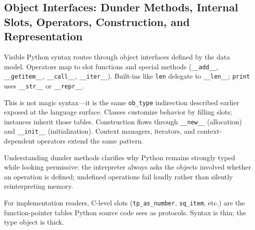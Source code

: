 \subsection{Object Interfaces: Dunder Methods, Internal Slots, Operators, Construction, and Representation}

Visible Python syntax routes through object interfaces defined by the data model. Operators map to slot functions and special methods (\texttt{\_\_add\_\_}, \texttt{\_\_getitem\_\_}, \texttt{\_\_call\_\_}, \texttt{\_\_iter\_\_}). Built-ins like \texttt{len} delegate to \texttt{\_\_len\_\_}; \texttt{print} uses \texttt{\_\_str\_\_} or \texttt{\_\_repr\_\_}.

This is not magic syntax---it is the same \texttt{ob\_type} indirection described earlier exposed at the language surface. Classes customize behavior by filling slots; instances inherit those tables. Construction flows through \texttt{\_\_new\_\_} (allocation) and \texttt{\_\_init\_\_} (initialization). Context managers, iterators, and context-dependent operators extend the same pattern.

Understanding dunder methods clarifies why Python remains strongly typed while looking permissive: the interpreter always asks the objects involved whether an operation is defined; undefined operations fail loudly rather than silently reinterpreting memory.

For implementation readers, C-level slots (\texttt{tp\_as\_number}, \texttt{sq\_item}, etc.) are the function-pointer tables Python source code sees as protocols. Syntax is thin; the type object is thick.
